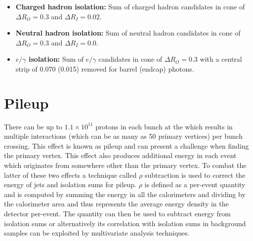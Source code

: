 \begin{itemize}
  \item{\textbf{Charged hadron isolation:} Sum of charged hadron \PF candidates \ET in cone of $\Delta R_{O}=0.3$ and $\Delta R_{I}=0.02$.} 
  \item{\textbf{Neutral hadron isolation:} Sum of neutral hadron \PF candidates \ET in cone of $\Delta R_{O}=0.3$ and $\Delta R_{I}=0.0$.}
  \item{\textbf{$e/\gamma$ isolation:} Sum of $e/\gamma$ \PF candidates \ET in cone of $\Delta R_{O}=0.3$ with a central \eta strip of 0.070 (0.015) removed for barrel (endcap) photons.}
\end{itemize}

\section{Pileup}
\label{sec:pileup}

There can be up to $1.1\times10^{11}$ protons in each bunch at the \LHC which results in multiple interactions (which can be as many as 50 primary vertices) per bunch crossing. This effect is known as pileup and can present a challenge when finding the primary vertex. This effect also produces additional energy in each event which originates from somewhere other than the primary vertex. To combat the latter of these two effects a technique called $\rho$ subtraction is used to correct the energy of jets and isolation sums for pileup. $\rho$ is defined as a per-event quantity and is computed by summing the energy in all the calorimeters and dividing by the calorimeter area and thus represents the average energy density in the detector per-event. The quantity \rho can then be used to subtract energy from isolation sums or alternatively its correlation with isolation sums in background samples can be exploited by multivariate analysis techniques.




